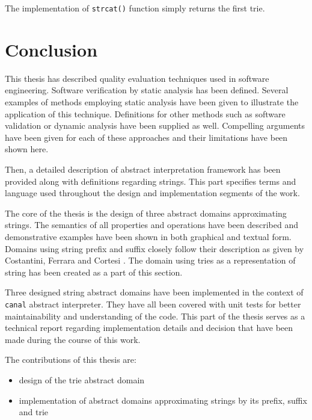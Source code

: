 \documentclass[12pt,final,oneside]{fithesis2}
\theoremstyle{definition}
\begin{document}
The implementation of \texttt{strcat()} function simply returns the first trie.


\chapter{Conclusion}
\label{chap:conclusion}

This thesis has described quality evaluation techniques used in software
engineering. Software verification by static analysis has been defined.
Several examples of methods employing static analysis have been given to
illustrate the application of this technique. Definitions for other methods
such as software validation or dynamic analysis have been supplied as well.
Compelling arguments have been given for each of these approaches and their
limitations have been shown here.

Then, a detailed description of abstract interpretation framework has been provided
along with definitions regarding strings. This part specifies terms and language used
throughout the design and implementation segments of the work.

The core of the thesis is the design of three abstract domains
approximating strings. The semantics of all properties and operations
have been described and demonstrative examples have been shown in both
graphical and textual form. Domains using string prefix and suffix
closely follow their description as given by Costantini, Ferrara and
Cortesi \cite{Constantini11-1}. The domain using tries as a representation
of string has been created as a part of this section.

Three designed string abstract domains have been implemented in the context of
\texttt{canal} abstract interpreter. They have all been covered with
unit tests for better maintainability and understanding of the code.
This part of the thesis serves as a technical report regarding implementation
details and decision that have been made during the course of this work.

The contributions of this thesis are:

\begin{itemize}

\item design of the trie abstract domain

\item implementation of abstract domains approximating strings by its
prefix, suffix and trie

\end{itemize}
\end{document}
